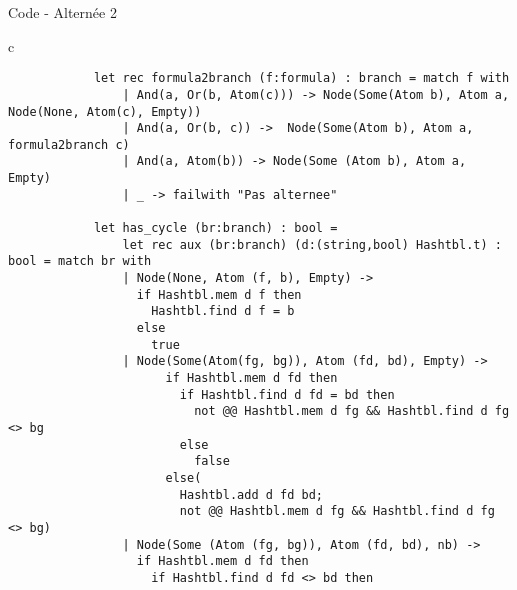 \documentclass[]{beamer}
\begin{document}
\begin{frame}[fragile]{Code - Alternée 2}
    \begin{center}
        \begin{tabular}{c}
            \begin{lstlisting}
            let rec formula2branch (f:formula) : branch = match f with
                | And(a, Or(b, Atom(c))) -> Node(Some(Atom b), Atom a, Node(None, Atom(c), Empty))
                | And(a, Or(b, c)) ->  Node(Some(Atom b), Atom a, formula2branch c)
                | And(a, Atom(b)) -> Node(Some (Atom b), Atom a, Empty)
                | _ -> failwith "Pas alternee"
              
            let has_cycle (br:branch) : bool = 
                let rec aux (br:branch) (d:(string,bool) Hashtbl.t) : bool = match br with
                | Node(None, Atom (f, b), Empty) -> 
                  if Hashtbl.mem d f then 
                    Hashtbl.find d f = b
                  else
                    true
                | Node(Some(Atom(fg, bg)), Atom (fd, bd), Empty) -> 
                      if Hashtbl.mem d fd then
                        if Hashtbl.find d fd = bd then
                          not @@ Hashtbl.mem d fg && Hashtbl.find d fg <> bg
                        else 
                          false
                      else(
                        Hashtbl.add d fd bd;
                        not @@ Hashtbl.mem d fg && Hashtbl.find d fg <> bg)
                | Node(Some (Atom (fg, bg)), Atom (fd, bd), nb) ->
                  if Hashtbl.mem d fd then
                    if Hashtbl.find d fd <> bd then
            \end{lstlisting}
        \end{tabular}
    \end{center}   
\end{frame}
\end{document}
